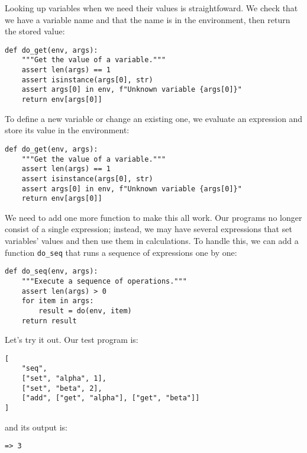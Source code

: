 \documentclass{scrbook}
\begin{document}
Looking up variables when we need their values is straightfoward.
We check that we have a variable name and that the name is in the environment,
then return the stored value:


\begin{lstlisting}[frame=single,frameround=tttt]
def do_get(env, args):
    """Get the value of a variable."""
    assert len(args) == 1
    assert isinstance(args[0], str)
    assert args[0] in env, f"Unknown variable {args[0]}"
    return env[args[0]]
\end{lstlisting}



To define a new variable or change an existing one,
we evaluate an expression and store its value in the environment:


\begin{lstlisting}[frame=single,frameround=tttt]
def do_get(env, args):
    """Get the value of a variable."""
    assert len(args) == 1
    assert isinstance(args[0], str)
    assert args[0] in env, f"Unknown variable {args[0]}"
    return env[args[0]]
\end{lstlisting}



We need to add one more function to make this all work.
Our programs no longer consist of a single expression;
instead,
we may have several expressions that set variables' values
and then use them in calculations.
To handle this,
we can add a function \texttt{do\_seq} that runs a sequence of expressions one by one:


\begin{lstlisting}[frame=single,frameround=tttt]
def do_seq(env, args):
    """Execute a sequence of operations."""
    assert len(args) > 0
    for item in args:
        result = do(env, item)
    return result
\end{lstlisting}



Let's try it out.
Our test program is:


\begin{lstlisting}[frame=single,frameround=tttt]
[
    "seq",
    ["set", "alpha", 1],
    ["set", "beta", 2],
    ["add", ["get", "alpha"], ["get", "beta"]]
]
\end{lstlisting}



\noindent and its output is:


\begin{lstlisting}[frame=single,frameround=tttt]
=> 3
\end{lstlisting}
\end{document}
